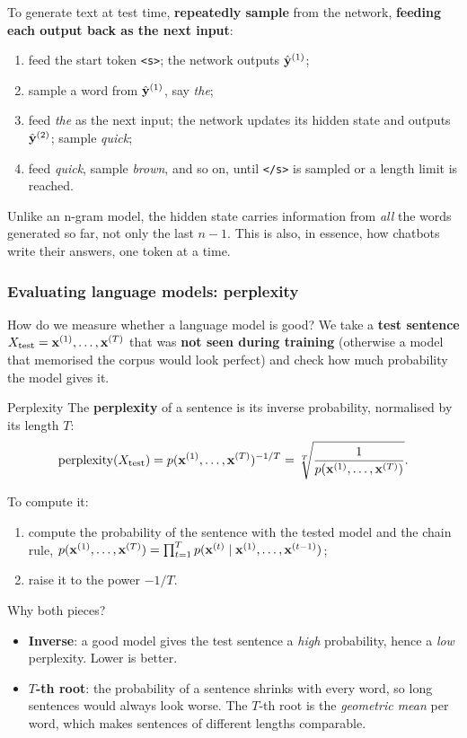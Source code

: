 To generate text at test time, \textbf{repeatedly sample} from the network,
\textbf{feeding each output back as the next input}:
\begin{enumerate}[nosep]
  \item feed the start token \texttt{<s>}; the network outputs $\hat{\mathbf{y}}^{(1)}$;
  \item sample a word from $\hat{\mathbf{y}}^{(1)}$, say \emph{the};
  \item feed \emph{the} as the next input; the network updates its hidden state and
        outputs $\hat{\mathbf{y}}^{(2)}$; sample \emph{quick};
  \item feed \emph{quick}, sample \emph{brown}, and so on, until \texttt{</s>} is
        sampled or a length limit is reached.
\end{enumerate}
Unlike an n-gram model, the hidden state carries information from \emph{all} the words
generated so far, not only the last $n-1$. This is also, in essence, how chatbots
write their answers, one token at a time.

\subsubsection{Evaluating language models: perplexity}

How do we measure whether a language model is good? We take a \textbf{test sentence}
$X_{\text{test}} = \mathbf{x}^{(1)}, \ldots, \mathbf{x}^{(T)}$ that was \textbf{not seen
during training} (otherwise a model that memorised the corpus would look perfect) and
check how much probability the model gives it.

\begin{nbdef}{Perplexity}
The \textbf{perplexity} of a sentence is its inverse probability, normalised by its
length $T$:
\[
  \text{perplexity}(X_{\text{test}}) = p(\mathbf{x}^{(1)}, \ldots, \mathbf{x}^{(T)})^{-1/T}
  = \sqrt[T]{\frac{1}{p(\mathbf{x}^{(1)}, \ldots, \mathbf{x}^{(T)})}} .
\]
\end{nbdef}
To compute it:
\begin{enumerate}[nosep]
  \item compute the probability of the sentence with the tested model and the chain
        rule, $p(\mathbf{x}^{(1)}, \ldots, \mathbf{x}^{(T)}) = \prod_{t=1}^{T}
        p(\mathbf{x}^{(t)} \mid \mathbf{x}^{(1)}, \ldots, \mathbf{x}^{(t-1)})$;
  \item raise it to the power $-1/T$.
\end{enumerate}
Why both pieces?
\begin{itemize}[nosep]
  \item \textbf{Inverse}: a good model gives the test sentence a \emph{high}
        probability, hence a \emph{low} perplexity. Lower is better.
  \item \textbf{$T$-th root}: the probability of a sentence shrinks with every word, so
        long sentences would always look worse. The $T$-th root is the
        \emph{geometric mean} per word, which makes sentences of different lengths
        comparable.
\end{itemize}

